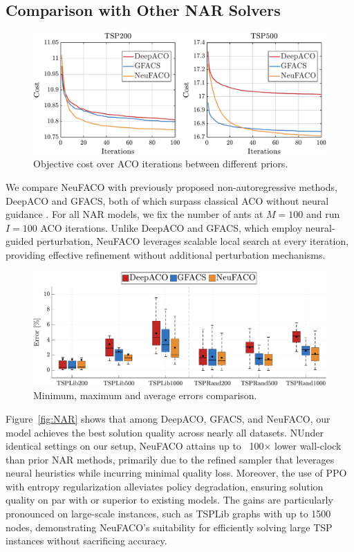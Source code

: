 \documentclass[a4paper,conference]{IEEEtran}
\begin{document}
\subsection{Comparison with Other NAR Solvers}

\begin{figure}[htbp]
  \centering
  \includegraphics[width=\linewidth]{TSP200_vs_TSP500_3lines.pdf}
  \caption{Objective cost over ACO iterations between different priors.}
  \label{fig:over_iterations}
\end{figure}

We compare NeuFACO with previously proposed non-autoregressive methods, DeepACO and GFACS, both of which surpass classical ACO without neural guidance \cite{DeepACO,GFACS}. For all NAR models, we fix the number of ants at $M=100$ and run $I=100$ ACO iterations. Unlike DeepACO and GFACS, which employ neural-guided perturbation, NeuFACO leverages scalable local search at every iteration, providing effective refinement without additional perturbation mechanisms.


\begin{figure}[h]
  \centering
  \includegraphics[width=\linewidth]{TSPOverview.pdf}
  \caption{Minimum, maximum and average errors comparison.}
  \label{fig:candle}
\end{figure}

Figure~\ref{fig:NAR} shows that among DeepACO, GFACS, and NeuFACO, our model achieves the best solution quality across nearly all datasets. NUnder identical settings on our setup, NeuFACO attains up to ~100× lower wall-clock than prior NAR methods, primarily due to the refined sampler that leverages neural heuristics while incurring minimal quality loss. Moreover, the use of PPO with entropy regularization alleviates policy degradation, ensuring solution quality on par with or superior to existing models. The gains are particularly pronounced on large-scale instances, such as TSPLib graphs with up to 1500 nodes, demonstrating NeuFACO’s suitability for efficiently solving large TSP instances without sacrificing accuracy.
\end{document}

